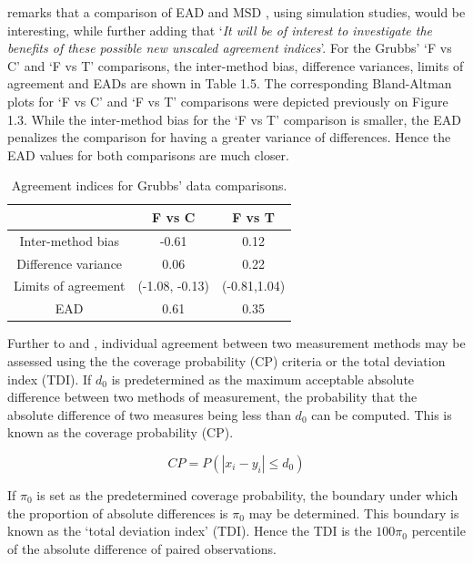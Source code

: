 \documentclass[12pt, a4paper]{report}
\theoremstyle{plain}
\theoremstyle{definition}
\theoremstyle{remark}
\begin{document}
	\citet{Barnhart} remarks that a comparison of EAD and MSD , using
	simulation studies, would be interesting, while further adding
	that `\textit{It will be of interest to investigate the benefits of these
		possible new unscaled agreement indices}'. For the Grubbs' `F vs C' and `F vs T' comparisons, the inter-method bias, difference variances, limits of agreement and EADs are shown
	in Table 1.5. The corresponding Bland-Altman plots for `F vs C' and `F vs T' comparisons were depicted previously on Figure 1.3. While the inter-method bias for the `F vs T' comparison is smaller, the EAD penalizes the comparison for having a greater variance of differences. Hence the EAD values for both comparisons are much closer.
	\begin{table}[ht]
		\begin{center}
			\begin{tabular}{|c|c|c|}
				\hline
				& F vs C & F vs T  \\
				\hline
				Inter-method bias & -0.61 & 0.12 \\ \hline
				Difference variance & 0.06 & 0.22  \\ \hline 
				Limits of agreement & (-1.08,	-0.13) & (-0.81,1.04) \\
				EAD & 0.61 & 0.35  \\ \hline 
				\hline
			\end{tabular}
			\caption{Agreement indices for Grubbs' data comparisons.}
		\end{center}
	\end{table}
	
	Further to  \citet{lin2000} and \citet{lin2002}, individual agreement between two measurement methods may be
	assessed using the the coverage probability (CP) criteria or the total deviation index (TDI). If $d_{0}$ is predetermined as the maximum acceptable absolute difference between two methods of measurement, the probability that the absolute difference of two measures being less than $d_{0}$ can be computed. This is known as the coverage probability (CP).
	
	\begin{equation}
	CP = P(|x_{i} - y_{i}| \leq d_{0})
	\end{equation}
	
	If $\pi_{0}$ is set as the predetermined coverage probability, the
	boundary under which the proportion of absolute differences is
	$\pi_{0}$ may be determined. This boundary is known as the `total
	deviation index' (TDI). Hence the TDI is the $100\pi_{0}$
	percentile of the absolute difference of paired observations.
\end{document}

